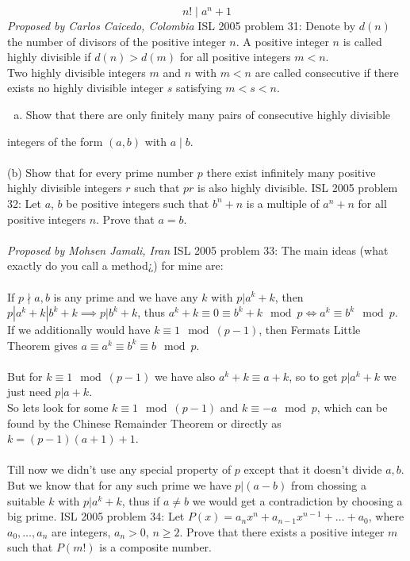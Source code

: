 \[ n!\mid a^n + 1 \]
\textit{Proposed by Carlos Caicedo, Colombia} 
ISL 2005 problem 31:  Denote by $d(n)$ the number of divisors of the positive integer $n$. A positive integer $n$ is called highly divisible if $d(n) > d(m)$ for all positive integers $m < n$. \\
Two highly divisible integers $m$ and $n$ with $m < n$ are called consecutive if there exists no highly divisible integer $s$ satisfying $m < s < n$.
\begin{enumerate}[(a)]
  \item Show that there are only finitely many pairs of consecutive highly divisible
\end{enumerate}
integers of the form $(a, b)$ with $a\mid b$. \\\\
(b) Show that for every prime number $p$ there exist infinitely many positive highly divisible integers $r$ such that $pr$ is also highly divisible. 
ISL 2005 problem 32:  Let $a$, $b$ be positive integers such that $b^n+n$ is a multiple of $a^n+n$ for all positive integers $n$. Prove that $a=b$. \\\\
\textit{Proposed by Mohsen Jamali, Iran} 
ISL 2005 problem 33:  The main ideas (what exactly do you call a method¿) for mine are: \\\\
If $p \nmid a,b$ is any prime and we have any $k$ with $p|a^k+k$, then $p|a^k+k|b^k+k \implies p|b^k+k$, thus $a^k+k \equiv 0 \equiv b^k+k \mod p \iff a^k\equiv b^k\mod p$. If we additionally would have $k \equiv 1 \mod (p-1)$, then Fermats Little Theorem gives $a \equiv a^k\equiv b^k\equiv b \mod p$. \\\\
But for $k \equiv 1 \mod (p-1)$ we have also $a^k+k \equiv a+k$, so to get $p|a^k+k$ we just need $p|a+k$. \\
So lets look for some $k \equiv 1 \mod (p-1)$ and $k \equiv-a \mod p$, which can be found by the Chinese Remainder Theorem or directly as $k=(p-1)(a+1)+1$. \\\\
Till now we didn't use any special property of $p$ except that it doesn't divide $a,b$. But we know that for any such prime we have $p|(a-b)$ from chossing a suitable $k$ with $p|a^k+k$, thus if $a \neq b$ we would get a contradiction by choosing a big prime. 
ISL 2005 problem 34:  Let $P(x)=a_nx^n+a_{n-1}x^{n-1}+\ldots+a_0$, where $a_0,\ldots,a_n$ are integers, $a_n>0$, $n\geq 2$. Prove that there exists a positive integer $m$ such that $P(m!)$ is a composite number. 

